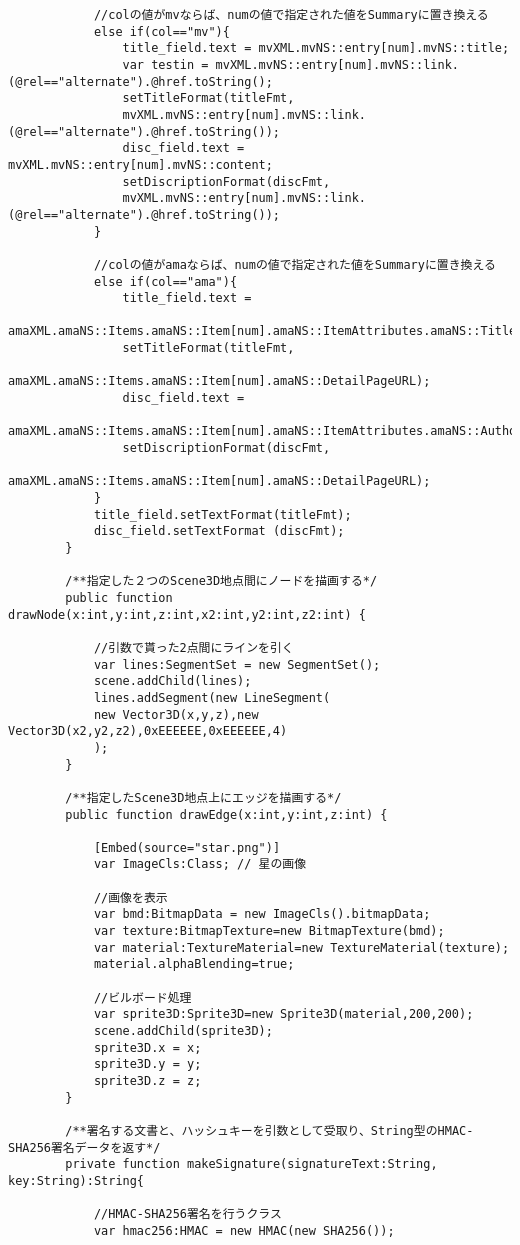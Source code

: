 {\begin{verbatim}
			//colの値がmvならば、numの値で指定された値をSummaryに置き換える
			else if(col=="mv"){
				title_field.text = mvXML.mvNS::entry[num].mvNS::title;
				var testin = mvXML.mvNS::entry[num].mvNS::link.(@rel=="alternate").@href.toString();
				setTitleFormat(titleFmt,
				mvXML.mvNS::entry[num].mvNS::link.(@rel=="alternate").@href.toString());
				disc_field.text = mvXML.mvNS::entry[num].mvNS::content;
				setDiscriptionFormat(discFmt,
				mvXML.mvNS::entry[num].mvNS::link.(@rel=="alternate").@href.toString());
			}
			
			//colの値がamaならば、numの値で指定された値をSummaryに置き換える
			else if(col=="ama"){
				title_field.text = 
				amaXML.amaNS::Items.amaNS::Item[num].amaNS::ItemAttributes.amaNS::Title.toString();
				setTitleFormat(titleFmt,
				amaXML.amaNS::Items.amaNS::Item[num].amaNS::DetailPageURL);
				disc_field.text = 
				amaXML.amaNS::Items.amaNS::Item[num].amaNS::ItemAttributes.amaNS::Author.toString();
				setDiscriptionFormat(discFmt,
				amaXML.amaNS::Items.amaNS::Item[num].amaNS::DetailPageURL);
			}
			title_field.setTextFormat(titleFmt);
			disc_field.setTextFormat (discFmt);
		}

		/**指定した２つのScene3D地点間にノードを描画する*/
		public function drawNode(x:int,y:int,z:int,x2:int,y2:int,z2:int) {
			
			//引数で貰った2点間にラインを引く
			var lines:SegmentSet = new SegmentSet();
			scene.addChild(lines);
			lines.addSegment(new LineSegment(
			new Vector3D(x,y,z),new Vector3D(x2,y2,z2),0xEEEEEE,0xEEEEEE,4)
			);
		}

		/**指定したScene3D地点上にエッジを描画する*/
		public function drawEdge(x:int,y:int,z:int) {
			
			[Embed(source="star.png")]
			var ImageCls:Class; // 星の画像
					
			//画像を表示
			var bmd:BitmapData = new ImageCls().bitmapData;
			var texture:BitmapTexture=new BitmapTexture(bmd);
			var material:TextureMaterial=new TextureMaterial(texture);
			material.alphaBlending=true;
				
			//ビルボード処理
			var sprite3D:Sprite3D=new Sprite3D(material,200,200);
			scene.addChild(sprite3D);
			sprite3D.x = x;
			sprite3D.y = y;
			sprite3D.z = z;
		}
		
		/**署名する文書と、ハッシュキーを引数として受取り、String型のHMAC-SHA256署名データを返す*/
		private function makeSignature(signatureText:String, key:String):String{
			
			//HMAC-SHA256署名を行うクラス
			var hmac256:HMAC = new HMAC(new SHA256());
			

\end{verbatim}}
